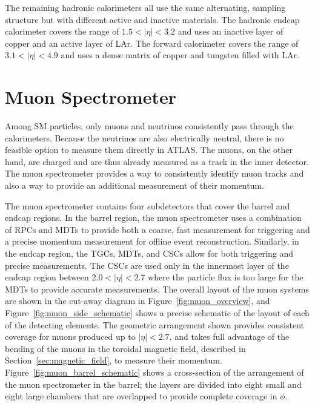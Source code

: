 The remaining hadronic calorimeters all use the same alternating, sampling structure but with different active and inactive materials.
The hadronic endcap calorimeter covers the range of $1.5 < |\eta| < 3.2$ and uses an inactive layer of copper and an active layer of \acl{LAr}.
The forward calorimeter covers the range of $3.1 < |\eta| < 4.9$ and uses a dense matrix of copper and tungsten filled with \acl{LAr}. 


\section{Muon Spectrometer}

Among \ac{SM} particles, only muons and neutrinos consistently pass through the calorimeters.
Because the neutrinos are also electrically neutral, there is no feasible option to measure them directly in ATLAS.
The muons, on the other hand, are charged and are thus already measured as a track in the inner detector.
The muon spectrometer provides a way to consistently identify muon tracks and also a way to provide an additional measurement of their momentum.

The muon spectrometer contains four subdetectors that cover the barrel and endcap regions.
In the barrel region, the muon spectrometer uses a combination of \acp{RPC} and \acp{MDT} to provide both a coarse, fast measurement for triggering and a precise momentum measurement for offline event reconstruction.
Similarly, in the endcap region, the \acp{TGC}, \acp{MDT}, and \acp{CSC} allow for both triggering and precise measurements.
The \acp{CSC} are used only in the innermost layer of the endcap region between $2.0 < |\eta| < 2.7$ where the particle flux is too large for the \acp{MDT} to provide accurate measurements.
The overall layout of the muon systems are shown in the cut-away diagram in Figure~\ref{fig:muon_overview}, and Figure~\ref{fig:muon_side_schematic} shows a precise schematic of the layout of each of the detecting elements.
The geometric arrangement shown provides consistent coverage for muons produced up to $|\eta| < 2.7$, and takes full advantage of the bending of the muons in the toroidal magnetic field, described in Section~\ref{sec:magnetic_field}, to measure their momentum.
Figure~\ref{fig:muon_barrel_schematic} shows a cross-section of the arrangement of the muon spectrometer in the barrel; the layers are divided into eight small and eight large chambers that are overlapped to provide complete coverage in $\phi$. 


